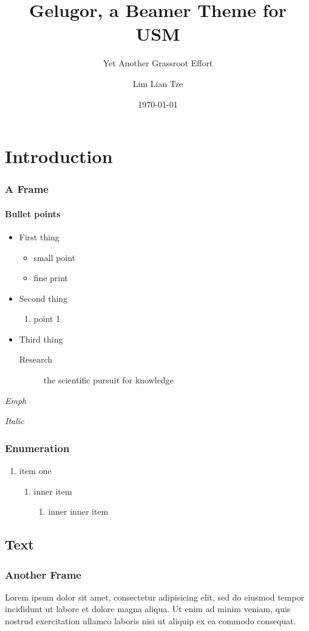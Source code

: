 \documentclass{beamer}
\title{Gelugor, a Beamer Theme for USM}
\subtitle{Yet Another Grassroot Effort}
\author{Lim Lian Tze}
\date{\today}
\institute[testing]{\url{liantze@gmail.com}\\\url{http://liantze.penguinattack.org/}}
\begin{document}
\maketitle


\section{Introduction}
\begin{frame}
\frametitle{A Frame}
\framesubtitle{Bullet points}
\begin{itemize}
\item First thing
	\begin{itemize}
	\item small point
	\item fine print
	\end{itemize}
\item Second thing
	\begin{enumerate}
	\item point 1
	\end{enumerate}
\item Third thing
	\begin{description}
	\item[Research] the scientific pursuit for knowledge
	\end{description}
\end{itemize}
\end{frame}

\begin{frame}
  \emph{Emph}

  \textit{Italic}

  \frametitle{Enumeration}
  \begin{enumerate}
    \item item one
      \begin{enumerate}
        \item inner item
          \begin{enumerate}
            \item inner inner item
          \end{enumerate}
      \end{enumerate}
  \end{enumerate}
\end{frame}

\subsection{Text}
\begin{frame}
\frametitle{Another Frame}
Lorem ipsum dolor sit amet, consectetur adipisicing elit, sed do eiusmod tempor incididunt ut labore et dolore magna aliqua. Ut enim ad minim veniam, quis nostrud exercitation ullamco laboris nisi ut aliquip ex ea commodo consequat.
\end{frame}
\end{document}
